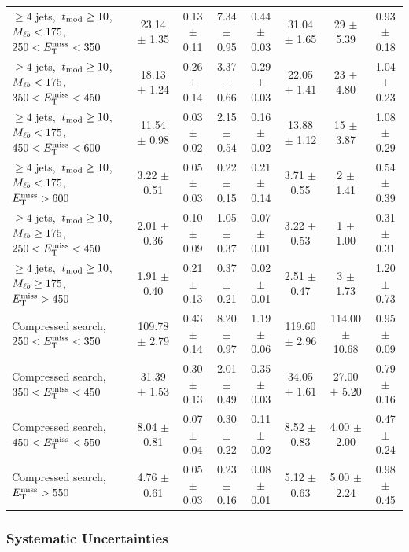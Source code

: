\begin{table}
{\begin{tabular}{|l|c c c c c|c|c|}
\hline
$\ge4$ jets,~$t_\text{mod} \ge10$,~$M_{\ell b}<175$,~$250<E_\text{T}^\text{miss}<350$  & 23.14 $\pm$ 1.35  & 0.13 $\pm$ 0.11  & 7.34 $\pm$ 0.95  & 0.44 $\pm$ 0.03  & 31.04 $\pm$ 1.65  & 29 $\pm$ 5.39  & 0.93 $\pm$ 0.18 \\*
$\ge4$ jets,~$t_\text{mod} \ge10$,~$M_{\ell b}<175$,~$350<E_\text{T}^\text{miss}<450$  & 18.13 $\pm$ 1.24  & 0.26 $\pm$ 0.14  & 3.37 $\pm$ 0.66  & 0.29 $\pm$ 0.03  & 22.05 $\pm$ 1.41  & 23 $\pm$ 4.80  & 1.04 $\pm$ 0.23 \\*
$\ge4$ jets,~$t_\text{mod} \ge10$,~$M_{\ell b}<175$,~$450<E_\text{T}^\text{miss}<600$  & 11.54 $\pm$ 0.98  & 0.03 $\pm$ 0.02  & 2.15 $\pm$ 0.54  & 0.16 $\pm$ 0.02  & 13.88 $\pm$ 1.12  & 15 $\pm$ 3.87  & 1.08 $\pm$ 0.29 \\*
$\ge4$ jets,~$t_\text{mod} \ge10$,~$M_{\ell b}<175$,~$E_\text{T}^\text{miss}>600$  & 3.22 $\pm$ 0.51  & 0.05 $\pm$ 0.03  & 0.22 $\pm$ 0.15  & 0.21 $\pm$ 0.14  & 3.71 $\pm$ 0.55  & 2 $\pm$ 1.41  & 0.54 $\pm$ 0.39 \\*
\hline
$\ge4$ jets,~$t_\text{mod} \ge10$,~$M_{\ell b}\ge175$,~$250<E_\text{T}^\text{miss}<450$  & 2.01 $\pm$ 0.36  & 0.10 $\pm$ 0.09  & 1.05 $\pm$ 0.37  & 0.07 $\pm$ 0.01  & 3.22 $\pm$ 0.53  & 1 $\pm$ 1.00  & 0.31 $\pm$ 0.31 \\*
$\ge4$ jets,~$t_\text{mod} \ge10$,~$M_{\ell b}\ge175$,~$E_\text{T}^\text{miss}>450$  & 1.91 $\pm$ 0.40  & 0.21 $\pm$ 0.13  & 0.37 $\pm$ 0.21  & 0.02 $\pm$ 0.01  & 2.51 $\pm$ 0.47  & 3 $\pm$ 1.73  & 1.20 $\pm$ 0.73 \\*
\hline
Compressed search, $250<E_\text{T}^\text{miss}<350$  & 109.78 $\pm$ 2.79  & 0.43 $\pm$ 0.14  & 8.20 $\pm$ 0.97  & 1.19 $\pm$ 0.06  & 119.60 $\pm$ 2.96  & 114.00 $\pm$ 10.68  & 0.95 $\pm$ 0.09 \\*
Compressed search, $350<E_\text{T}^\text{miss}<450$  & 31.39 $\pm$ 1.53  & 0.30 $\pm$ 0.13  & 2.01 $\pm$ 0.49  & 0.35 $\pm$ 0.03  & 34.05 $\pm$ 1.61  & 27.00 $\pm$ 5.20  & 0.79 $\pm$ 0.16 \\*
Compressed search, $450<E_\text{T}^\text{miss}<550$  & 8.04 $\pm$ 0.81  & 0.07 $\pm$ 0.04  & 0.30 $\pm$ 0.22  & 0.11 $\pm$ 0.02  & 8.52 $\pm$ 0.83  & 4.00 $\pm$ 2.00  & 0.47 $\pm$ 0.24 \\*
Compressed search, $E_\text{T}^\text{miss}>550$  & 4.76 $\pm$ 0.61  & 0.05 $\pm$ 0.03  & 0.23 $\pm$ 0.16  & 0.08 $\pm$ 0.01  & 5.12 $\pm$ 0.63  & 5.00 $\pm$ 2.24  & 0.98 $\pm$ 0.45 \\*
\hline
\end{tabular}
}
\end{table}

\subsubsection{Systematic Uncertainties}
\label{sssec:stop:lostlep:systematics}

